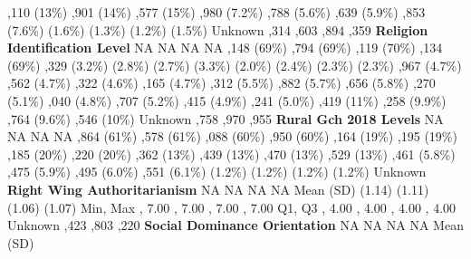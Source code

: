 \documentclass[
  single column]{article}
\begin{document}
\begin{table}
{,110 (13\%) ,901 (14\%) ,577 (15\%)
\textbar{}  ,980 (7.2\%) ,788 (5.6\%)
,639 (5.9\%) ,853 (7.6\%) \textbar{} 
 (1.6\%)  (1.3\%)  (1.2\%) 
(1.5\%) \textbar{} \textbar Unknown ,314 ,603
,894 ,359 \textbar{} \textbar{}\textbf{Religion
Identification Level} \textbar NA \textbar NA \textbar NA \textbar NA
\textbar{}  ,148 (69\%) ,794 (69\%)
,119 (70\%) ,134 (69\%) \textbar{} 
,329 (3.2\%)  (2.8\%)  (2.7\%)
 (3.3\%) \textbar{}   (2.0\%) 
(2.4\%)  (2.3\%)  (2.3\%) \textbar{} 
,967 (4.7\%) ,562 (4.7\%) ,322 (4.6\%)
,165 (4.7\%) \textbar{}  ,312 (5.5\%)
,882 (5.7\%) ,656 (5.8\%) ,270 (5.1\%)
\textbar{}  ,040 (4.8\%) ,707 (5.2\%)
,415 (4.9\%) ,241 (5.0\%) \textbar{} 
,419 (11\%) ,258 (9.9\%) ,764 (9.6\%)
,546 (10\%) \textbar{} \textbar Unknown 
,758 ,970 ,955 \textbar{}
\textbar{}\textbf{Rural Gch 2018 Levels} \textbar NA \textbar NA
\textbar NA \textbar NA \textbar{}  ,864 (61\%)
,578 (61\%) ,088 (60\%) ,950 (60\%)
\textbar{}  ,164 (19\%) ,195 (19\%)
,185 (20\%) ,220 (20\%) \textbar{} 
,362 (13\%) ,439 (13\%) ,470 (13\%)
,529 (13\%) \textbar{}  ,461 (5.8\%)
,475 (5.9\%) ,495 (6.0\%) ,551 (6.1\%)
\textbar{}   (1.2\%)  (1.2\%) 
(1.2\%)  (1.2\%) \textbar{} \textbar Unknown 
   \textbar{} \textbar{}\textbf{Right
Wing Authoritarianism} \textbar NA \textbar NA \textbar NA \textbar NA
\textbar{} \textbar Mean (SD)  (1.14)  (1.11)
 (1.06)  (1.07) \textbar{} \textbar Min, Max
, 7.00 , 7.00 , 7.00 ,
7.00 \textbar{} \textbar Q1, Q3 , 4.00 , 4.00
, 4.00 , 4.00 \textbar{} \textbar Unknown
 ,423 ,803 ,220 \textbar{}
\textbar{}\textbf{Social Dominance Orientation} \textbar NA \textbar NA
\textbar NA \textbar NA \textbar{} \textbar Mean (SD) 
}
\end{table}
\end{document}
